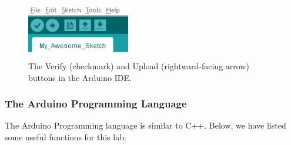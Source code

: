 \documentclass{article}
\begin{document}
\begin{figure}[ht]
    \centering
    \includegraphics[width = 0.4\textwidth]{images/verifyupload.png}
    \cprotect\caption{The Verify (checkmark) and Upload (rightward-facing arrow) buttons in the Arduino IDE.}
\end{figure}

\clearpage

\subsubsection{The Arduino Programming Language}

The Arduino Programming language is similar to C++. Below, we have listed some useful functions for this lab:
\end{document}
